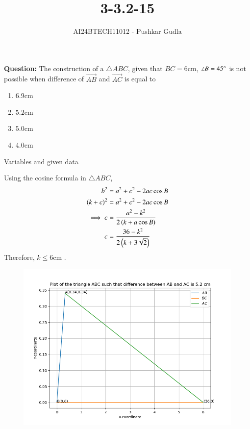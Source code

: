 \documentclass[journal]{IEEEtran}
\begin{document}

\vspace{3cm}

\title{3-3.2-15}
\author{AI24BTECH11012 - Pushkar Gudla}
{\let\newpage\relax\maketitle}

\renewcommand{\thefigure}{\theenumi}
\renewcommand{\thetable}{\theenumi}
\setlength{\intextsep}{10pt} %


\renewcommand{\thetable}{\theenumi}
\textbf{Question:} The construction of a $\triangle ABC$, given that $BC=6$cm, $\angle B=45\degree$ is not possible when difference of $\vec{AB}$ and $\vec{AC}$ is equal to
\begin{enumerate}
	\item $6.9$cm
	\item $5.2$cm
	\item $5.0$cm
	\item $4.0$cm
\end{enumerate}
\solution
\begin{table}[h!]    
  \centering
  
  \caption{Variables and given data}
  \label{tab 3.2.15}
\end{table}
Using the cosine formula in $\triangle ABC$,\\
\begin{align}
	b^2 &= a^2 + c^2 - 2ac\cos B \\
	\left(k+c\right)^2 &= a^2 + c^2 - 2ac\cos B \\
	\implies c &= \frac{a^2 - k^2}{2\left(k + a\cos B\right)}\\
	c &= \frac{36-k^2}{2\left(k + 3\sqrt{2}\right)}	
\end{align}
Therefore, $k \leq 6$cm .
\begin{figure}[h]
	\centering
	\includegraphics[scale=0.5]{figs/plot1.png}
	\label{Fig}
\end{figure}
\end{document}
